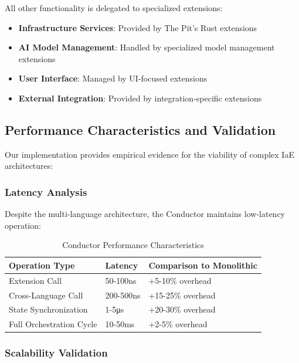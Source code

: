 All other functionality is delegated to specialized extensions:

\begin{itemize}
    \item \textbf{Infrastructure Services}: Provided by The Pit's Rust extensions
    \item \textbf{AI Model Management}: Handled by specialized model management extensions
    \item \textbf{User Interface}: Managed by UI-focused extensions
    \item \textbf{External Integration}: Provided by integration-specific extensions
\end{itemize}

\subsection{Performance Characteristics and Validation}

Our implementation provides empirical evidence for the viability of complex IaE architectures:

\subsubsection{Latency Analysis}

Despite the multi-language architecture, the Conductor maintains low-latency operation:

\begin{table}[ht]
\centering
\begin{tabular}{@{}lll@{}}
\toprule
\textbf{Operation Type} & \textbf{Latency} & \textbf{Comparison to Monolithic} \\
\midrule
Extension Call & 50-100ns & +5-10\% overhead \\
Cross-Language Call & 200-500ns & +15-25\% overhead \\
State Synchronization & 1-5μs & +20-30\% overhead \\
Full Orchestration Cycle & 10-50ms & +2-5\% overhead \\
\bottomrule
\end{tabular}
\caption{Conductor Performance Characteristics}
\label{tab:conductor-performance}
\end{table}

\subsubsection{Scalability Validation}

